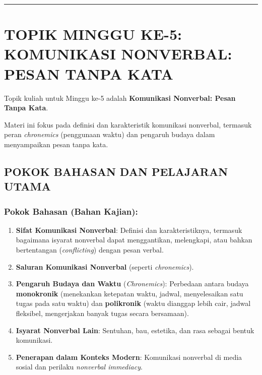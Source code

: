\documentclass[
  letterpaper,
  DIV=11,
  numbers=noendperiod]{scrreprt}
\providecommand{\tightlist}{%
  \setlength{\itemsep}{0pt}\setlength{\parskip}{0pt}}
\begin{document}
\begin{center}\rule{0.5\linewidth}{0.5pt}\end{center}

\section{TOPIK MINGGU KE-5: KOMUNIKASI NONVERBAL: PESAN TANPA
KATA}\label{topik-minggu-ke-5-komunikasi-nonverbal-pesan-tanpa-kata}

Topik kuliah untuk Minggu ke-5 adalah \textbf{Komunikasi Nonverbal:
Pesan Tanpa Kata}.

Materi ini fokus pada definisi dan karakteristik komunikasi nonverbal,
termasuk peran \emph{chronemics} (penggunaan waktu) dan pengaruh budaya
dalam menyampaikan pesan tanpa kata.

\subsection{POKOK BAHASAN DAN PELAJARAN
UTAMA}\label{pokok-bahasan-dan-pelajaran-utama}

\subsubsection{Pokok Bahasan (Bahan
Kajian):}\label{pokok-bahasan-bahan-kajian}

\begin{enumerate}
\def\labelenumi{\arabic{enumi}.}
\tightlist
\item
  \textbf{Sifat Komunikasi Nonverbal}: Definisi dan karakteristiknya,
  termasuk bagaimana isyarat nonverbal dapat menggantikan, melengkapi,
  atau bahkan bertentangan (\emph{conflicting}) dengan pesan verbal.
\item
  \textbf{Saluran Komunikasi Nonverbal} (seperti \emph{chronemics}).
\item
  \textbf{Pengaruh Budaya dan Waktu} (\emph{Chronemics}): Perbedaan
  antara budaya \textbf{monokronik} (menekankan ketepatan waktu, jadwal,
  menyelesaikan satu tugas pada satu waktu) dan \textbf{polikronik}
  (waktu dianggap lebih cair, jadwal fleksibel, mengerjakan banyak tugas
  secara bersamaan).
\item
  \textbf{Isyarat Nonverbal Lain}: Sentuhan, bau, estetika, dan rasa
  sebagai bentuk komunikasi.
\item
  \textbf{Penerapan dalam Konteks Modern}: Komunikasi nonverbal di media
  sosial dan perilaku \emph{nonverbal immediacy}.
\end{enumerate}
\end{document}
